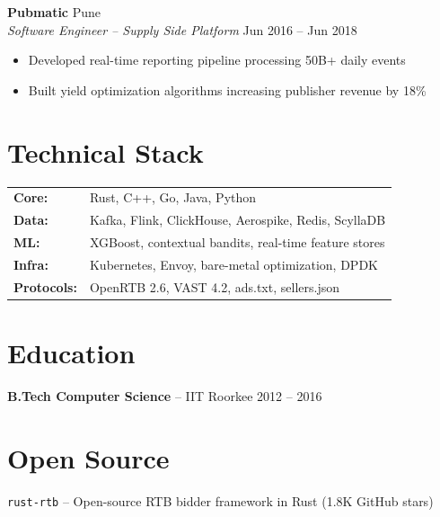 \documentclass[10pt,letterpaper]{article}
\begin{document}
\textbf{Pubmatic} \hfill Pune\\
\textit{Software Engineer -- Supply Side Platform} \hfill Jun 2016 -- Jun 2018
\begin{itemize}
\item Developed real-time reporting pipeline processing 50B+ daily events
\item Built yield optimization algorithms increasing publisher revenue by 18\%
\end{itemize}

\section{Technical Stack}
\begin{tabularx}{\linewidth}{@{}lX@{}}
\textbf{Core:} & Rust, C++, Go, Java, Python\\
\textbf{Data:} & Kafka, Flink, ClickHouse, Aerospike, Redis, ScyllaDB\\
\textbf{ML:} & XGBoost, contextual bandits, real-time feature stores\\
\textbf{Infra:} & Kubernetes, Envoy, bare-metal optimization, DPDK\\
\textbf{Protocols:} & OpenRTB 2.6, VAST 4.2, ads.txt, sellers.json\\
\end{tabularx}

\section{Education}
\textbf{B.Tech Computer Science} -- IIT Roorkee \hfill 2012 -- 2016

\section{Open Source}
\texttt{rust-rtb} -- Open-source RTB bidder framework in Rust (1.8K GitHub stars)
\end{document}
